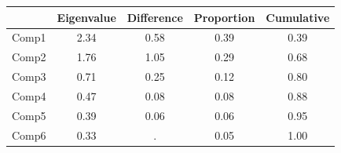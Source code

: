 {
\def\sym#1{\ifmmode^{#1}\else\(^{#1}\)\fi}
\begin{tabular}{l*{1}{cccc}}
\toprule
            &  Eigenvalue&  Difference&  Proportion&  Cumulative\\
\midrule
Comp1       &        2.34&        0.58&        0.39&        0.39\\
Comp2       &        1.76&        1.05&        0.29&        0.68\\
Comp3       &        0.71&        0.25&        0.12&        0.80\\
Comp4       &        0.47&        0.08&        0.08&        0.88\\
Comp5       &        0.39&        0.06&        0.06&        0.95\\
Comp6       &        0.33&           .&        0.05&        1.00\\
\bottomrule
\end{tabular}
}
